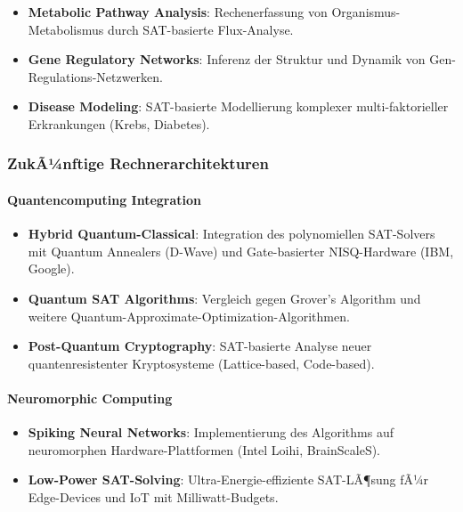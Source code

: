 ﻿\documentclass[a4paper,12pt]{article}
\theoremstyle{definition}
\begin{document}
\begin{itemize}
	\item \textbf{Metabolic Pathway Analysis}: Rechenerfassung von Organismus-Metabolismus durch SAT-basierte Flux-Analyse.
	
	\item \textbf{Gene Regulatory Networks}: Inferenz der Struktur und Dynamik von Gen-Regulations-Netzwerken.
	
	\item \textbf{Disease Modeling}: SAT-basierte Modellierung komplexer multi-faktorieller Erkrankungen (Krebs, Diabetes).
\end{itemize}

\subsubsection{ZukÃ¼nftige Rechnerarchitekturen}

\paragraph{Quantencomputing Integration}

\begin{itemize}
	\item \textbf{Hybrid Quantum-Classical}: Integration des polynomiellen SAT-Solvers mit Quantum Annealers (D-Wave) und Gate-basierter NISQ-Hardware (IBM, Google).
	
	\item \textbf{Quantum SAT Algorithms}: Vergleich gegen Grover's Algorithm und weitere Quantum-Approximate-Optimization-Algorithmen.
	
	\item \textbf{Post-Quantum Cryptography}: SAT-basierte Analyse neuer quantenresistenter Kryptosysteme (Lattice-based, Code-based).
\end{itemize}

\paragraph{Neuromorphic Computing}

\begin{itemize}
	\item \textbf{Spiking Neural Networks}: Implementierung des Algorithms auf neuromorphen Hardware-Plattformen (Intel Loihi, BrainScaleS).
	
	\item \textbf{Low-Power SAT-Solving}: Ultra-Energie-effiziente SAT-LÃ¶sung fÃ¼r Edge-Devices und IoT mit Milliwatt-Budgets.
\end{itemize}
\end{document}
